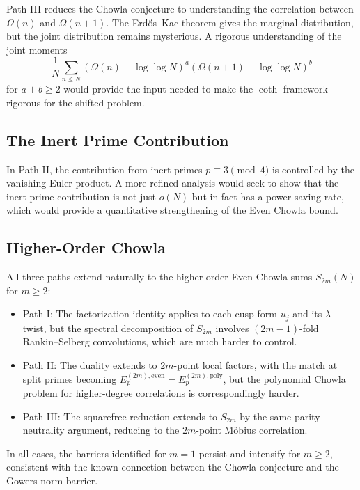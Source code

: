 \documentclass[11pt,a4paper]{article}
\theoremstyle{plain}
\theoremstyle{definition}
\begin{document}
Path III reduces the Chowla conjecture to understanding the correlation between $\Omega(n)$ and $\Omega(n+1)$. The Erd\H{o}s--Kac theorem gives the marginal distribution, but the joint distribution remains mysterious. A rigorous understanding of the joint moments
\begin{equation}\label{eq:joint-moments}
\frac{1}{N}\sum_{n \leq N} \left(\Omega(n) - \log\log N\right)^a \left(\Omega(n+1) - \log\log N\right)^b
\end{equation}
for $a + b \geq 2$ would provide the input needed to make the $\coth$ framework rigorous for the shifted problem.

\subsection{The Inert Prime Contribution}

In Path II, the contribution from inert primes $p \equiv 3 \pmod{4}$ is controlled by the vanishing Euler product. A more refined analysis would seek to show that the inert-prime contribution is not just $o(N)$ but in fact has a power-saving rate, which would provide a quantitative strengthening of the Even Chowla bound.

\subsection{Higher-Order Chowla}

All three paths extend naturally to the higher-order Even Chowla sums $S_{2m}(N)$ for $m \geq 2$:
\begin{itemize}
\item Path I: The factorization identity applies to each cusp form $u_j$ and its $\lambda$-twist, but the spectral decomposition of $S_{2m}$ involves $(2m-1)$-fold Rankin--Selberg convolutions, which are much harder to control.
\item Path II: The duality extends to $2m$-point local factors, with the match at split primes becoming $E_p^{(2m),\mathrm{even}} = E_p^{(2m),\mathrm{poly}}$, but the polynomial Chowla problem for higher-degree correlations is correspondingly harder.
\item Path III: The squarefree reduction extends to $S_{2m}$ by the same parity-neutrality argument, reducing to the $2m$-point M\"obius correlation.
\end{itemize}

In all cases, the barriers identified for $m = 1$ persist and intensify for $m \geq 2$, consistent with the known connection between the Chowla conjecture and the Gowers norm barrier.
\end{document}
